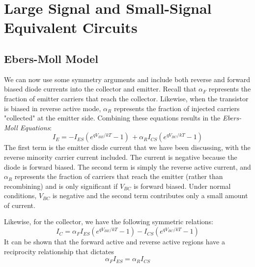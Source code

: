 \section{Large Signal and Small-Signal Equivalent Circuits}
\subsection{Ebers-Moll Model}
We can now use some symmetry arguments and include both reverse and forward biased diode currents into the collector and emitter.   Recall that $\alpha_F$ represents the fraction of emitter carriers that reach the collector.  Likewise, when the transistor is biased in reverse active mode, $\alpha_R$ represents the fraction of injected carriers "collected" at the emitter side.  Combining these equations results in the \emph{Ebers-Moll Equations}:
    \begin{equation}
        {I_E} =  - {I_{ES}}\left( {{e^{{qV_{BE}}/{kT}}} - 1} \right)\, + {\alpha _R}{I_{CS}}\left( {{e^{{qV_{BC}}/{kT}}} - 1} \right)
    \end{equation}
The first term is the emitter diode current that we have been discussing, with the reverse minority carrier current included.  The current is negative because the diode is forward biased.  The second term is simply the reverse active current, and $\alpha_R$ represents the fraction of carriers that reach the emitter (rather than recombining) and is only significant if $V_{BC}$ is forward biased.  Under normal conditions, $V_{BC}$ is negative and the second term contributes only a small amount of current.  

Likewise, for the collector, we have the following symmetric relations:
    \begin{equation}
        {I_C} = {\alpha _F}{I_{ES}}\left( {{e^{{qV_{BE}}/{kT}}} - 1} \right) - {I_{CS}}\left( {{e^{{qV_{BC}}/{kT}}} - 1} \right)
    \end{equation}
It can be shown that the forward active and reverse active regions have a reciprocity relationship that dictates 
    \begin{equation}
        {\alpha _F}{I_{ES}} = {\alpha _R}{I_{CS}}
    \end{equation}

